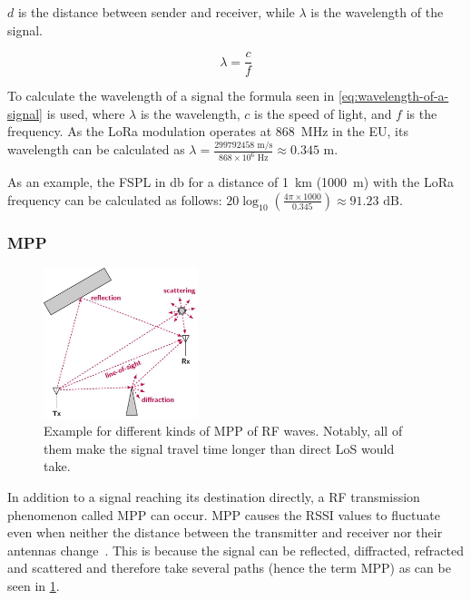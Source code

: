 $d$ is the distance between sender and receiver, while $\lambda$ is the wavelength of the signal.

\begin{equation}\label{eq:wavelength-of-a-signal}
    \lambda = \frac{c}{f}
\end{equation}

To calculate the wavelength of a signal the formula seen in \cref{eq:wavelength-of-a-signal} is used, where $\lambda$ is the wavelength, $c$ is the speed of light, and $f$ is the frequency.
As the \ac{LoRa} modulation operates at \SI{868}{\mega\hertz} in the \ac{EU}, its wavelength can be calculated as $\lambda = \frac{299792458 \text{ m/s}}{868 \times 10^6 \text{ Hz}} \approx 0.345 \text{ m}$.

As an example, the \ac{FSPL} in \si{\decibel} for a distance of \SI{1}{\kilo\metre} (\SI{1000}{\metre}) with the \ac{LoRa} frequency can be calculated as follows: $20 \log_{10}\left(\frac{4 \pi \times 1000}{0.345}\right) \approx 91.23 \text{ dB}$.

\subsubsection{\acf{MPP}}\label{sec:multipath-propagation}

\begin{figure}[htbp]
    \centering
    \includegraphics[width=0.4\textwidth]{pictures/diagrams_figures/multipath_propagation.jpg}
    \caption{
        Example for different kinds of \acf{MPP} of \ac{RF} waves.
        Notably, all of them make the signal travel time longer than direct \ac{LoS} would take.~\protect\cite{milosevic_key_2017}
    }\label{pic:figure_multipath_propagation}
\end{figure}

In addition to a signal reaching its destination directly, a \ac{RF} transmission phenomenon called \acf{MPP} can occur.
\acl{MPP} causes the \ac{RSSI} values to fluctuate even when neither the distance between the transmitter and receiver nor their antennas change~\cite[p. 136]{abdelfadeel_how_2019}.
This is because the signal can be reflected, diffracted, refracted and scattered and therefore take several paths (hence the term \ac{MPP}) as can be seen in \cref{pic:figure_multipath_propagation}.

